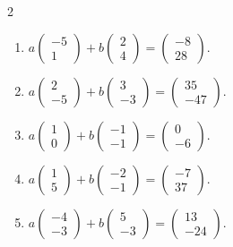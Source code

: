 \begin{multicols}{2}
\begin{enumerate}[label=\arabic*.,  leftmargin=*]
\item $a\begin{pmatrix} -5 \\ 1 \end{pmatrix} + b\begin{pmatrix} 2 \\ 4 \end{pmatrix} = \begin{pmatrix} -8 \\ 28 \end{pmatrix}$.
\item $a\begin{pmatrix} 2 \\ -5 \end{pmatrix} + b\begin{pmatrix} 3 \\ -3 \end{pmatrix} = \begin{pmatrix} 35 \\ -47 \end{pmatrix}$.
\item $a\begin{pmatrix} 1 \\ 0 \end{pmatrix} + b\begin{pmatrix} -1 \\ -1 \end{pmatrix} = \begin{pmatrix} 0 \\ -6 \end{pmatrix}$.
\item $a\begin{pmatrix} 1 \\ 5 \end{pmatrix} + b\begin{pmatrix} -2 \\ -1 \end{pmatrix} = \begin{pmatrix} -7 \\ 37 \end{pmatrix}$.
\item $a\begin{pmatrix} -4 \\ -3 \end{pmatrix} + b\begin{pmatrix} 5 \\ -3 \end{pmatrix} = \begin{pmatrix} 13 \\ -24 \end{pmatrix}$.

\end{enumerate}
\end{multicols}
